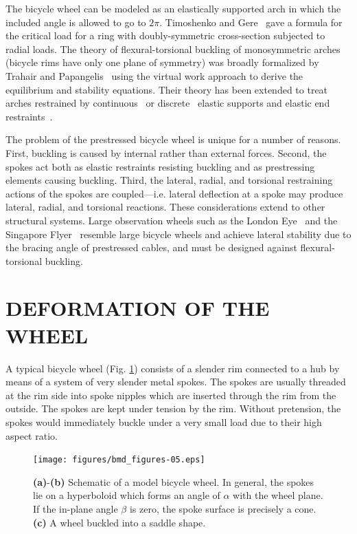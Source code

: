 \documentclass{bmd2016p}
\begin{document}
The bicycle wheel can be modeled as an elastically supported arch in which the included angle is allowed to go to $2\pi$. Timoshenko and Gere~\cite{Timoshenko1961a} gave a formula for the critical load for a ring with doubly-symmetric cross-section subjected to radial loads. The theory of flexural-torsional buckling of monosymmetric arches (bicycle rims have only one plane of symmetry) was broadly formalized by Trahair and Papangelis~\cite{Trahair1987b} using the virtual work approach to derive the equilibrium and stability equations. Their theory has been extended to treat arches restrained by continuous~\cite{Pi2002b} or discrete~\cite{Bradford2002d} elastic supports and elastic end restraints~\cite{Guo2014b}.

The problem of the prestressed bicycle wheel is unique for a number of reasons. First, buckling is caused by internal rather than external forces. Second, the spokes act both as elastic restraints resisting buckling and as prestressing elements causing buckling. Third, the lateral, radial, and torsional restraining actions of the spokes are coupled---i.e. lateral deflection at a spoke may produce lateral, radial, and torsional reactions. These considerations extend to other structural systems. Large observation wheels such as the London Eye~\cite{Mann2001a} and the Singapore Flyer~\cite{Allsop2009a} resemble large bicycle wheels and achieve lateral stability due to the bracing angle of prestressed cables, and must be designed against flexural-torsional buckling.



\section{DEFORMATION OF THE WHEEL}
A typical bicycle wheel (Fig. \ref{fig:schematic}) consists of a slender rim connected to a hub by means of a system of very slender metal spokes. The spokes are usually threaded at the rim side into spoke nipples which are inserted through the rim from the outside. The spokes are kept under tension by the rim. Without pretension, the spokes would immediately buckle under a very small load due to their high aspect ratio.

\begin{figure}[!h]
\centering
\texttt{[image: figures/bmd\_figures-05.eps]}
\caption{\textbf{(a)}-\textbf{(b)} Schematic of a model bicycle wheel. In general, the spokes lie on a hyperboloid which forms an angle of $\alpha$ with the wheel plane. If the in-plane angle $\beta$ is zero, the spoke surface is precisely a cone. \textbf{(c)} A wheel buckled into a saddle shape.}
\label{fig:schematic}
\end{figure}
\end{document}
